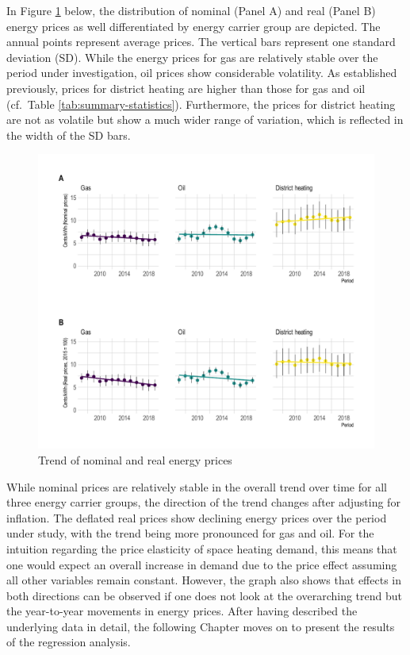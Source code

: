 \documentclass[12pt,twoside]{reedthesis}
\begin{document}
In Figure \ref{fig:price-descriptive-graph} below, the distribution of nominal (Panel A) and real (Panel B) energy prices as well differentiated by energy carrier group are depicted. The annual points represent average prices. The vertical bars represent one standard deviation (SD). While the energy prices for gas are relatively stable over the period under investigation, oil prices show considerable volatility. As established previously, prices for district heating are higher than those for gas and oil (cf.~Table \ref{tab:summary-statistics}). Furthermore, the prices for district heating are not as volatile but show a much wider range of variation, which is reflected in the width of the SD bars.
\begin{figure}

{\centering \includegraphics[width=1\linewidth]{figure/prices_descriptive} 

}

\caption{Trend of nominal and real energy prices}\label{fig:price-descriptive-graph}
\end{figure}
While nominal prices are relatively stable in the overall trend over time for all three energy carrier groups, the direction of the trend changes after adjusting for inflation. The deflated real prices show declining energy prices over the period under study, with the trend being more pronounced for gas and oil. For the intuition regarding the price elasticity of space heating demand, this means that one would expect an overall increase in demand due to the price effect assuming all other variables remain constant. However, the graph also shows that effects in both directions can be observed if one does not look at the overarching trend but the year-to-year movements in energy prices. After having described the underlying data in detail, the following Chapter moves on to present the results of the regression analysis.
\end{document}

